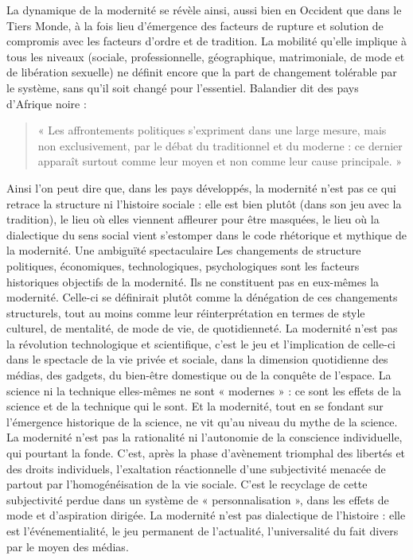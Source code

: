 La dynamique de la modernité se révèle ainsi, aussi bien en Occident que dans le Tiers Monde, à la fois lieu d'émergence des facteurs de rupture et solution de compromis avec les facteurs d'ordre et de tradition. La mobilité qu'elle implique à tous les niveaux (sociale, professionnelle, géographique, matrimoniale, de mode et de libération sexuelle) ne définit encore que la part de changement tolérable par le système, sans qu'il soit changé pour
l'essentiel. Balandier dit des pays d'Afrique noire : \begin{quote}
    « Les affrontements politiques s'expriment dans une large mesure, mais non exclusivement, par le débat du traditionnel et du moderne : ce dernier apparaît surtout comme leur moyen et non comme leur cause principale. » 
\end{quote}Ainsi l'on peut dire que, dans les pays développés, la modernité n'est pas ce qui retrace la structure ni l'histoire sociale : elle est bien plutôt (dans son jeu avec la tradition), le lieu où elles viennent affleurer pour être masquées, le lieu où la dialectique du sens social vient s'estomper dans le code rhétorique et mythique de la modernité.
Une ambiguïté spectaculaire
Les changements de structure politiques, économiques, technologiques, psychologiques sont les facteurs historiques objectifs de la modernité. Ils ne constituent pas en eux-mêmes la modernité. Celle-ci se définirait plutôt comme la dénégation de ces changements structurels, tout au moins comme leur réinterprétation en termes de style culturel, de mentalité, de mode de vie, de quotidienneté.
La modernité n'est pas la révolution technologique et scientifique, c'est le jeu et l'implication de celle-ci dans le spectacle de la vie privée et sociale, dans la dimension quotidienne des médias, des gadgets, du bien-être domestique ou de la conquête de l'espace. La science ni la technique elles-mêmes ne sont « modernes » : ce sont les effets de la science et de la technique qui le sont. Et la modernité, tout en se fondant sur l'émergence historique de la science, ne vit qu'au niveau du mythe de la science.
La modernité n'est pas la rationalité ni l'autonomie de la conscience individuelle, qui pourtant la fonde. C'est, après la phase d'avènement triomphal des libertés et des droits individuels, l'exaltation réactionnelle d'une subjectivité menacée de partout par l'homogénéisation de la vie sociale. C'est le recyclage de cette subjectivité perdue dans un système de « personnalisation », dans les effets de mode et d'aspiration dirigée.
La modernité n'est pas dialectique de l'histoire : elle est l'événementialité, le jeu permanent de l'actualité, l'universalité du fait divers par le moyen des médias.
